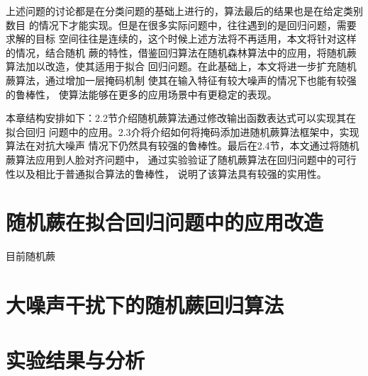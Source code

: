 上述问题的讨论都是在分类问题的基础上进行的，算法最后的结果也是在给定类别数目
的情况下才能实现。但是在很多实际问题中，往往遇到的是回归问题，需要求解的目标
空间往往是连续的，这个时候上述方法将不再适用，本文将针对这样的情况，结合随机
蕨的特性，借鉴回归算法在随机森林算法中的应用，将随机蕨算法加以改造，使其适用于拟合
回归问题。在此基础上，本文将进一步扩充随机蕨算法，通过增加一层掩码机制
使其在输入特征有较大噪声的情况下也能有较强的鲁棒性，
使算法能够在更多的应用场景中有更稳定的表现。

本章结构安排如下：2.2节介绍随机蕨算法通过修改输出函数表达式可以实现其在拟合回归
问题中的应用。2.3介将介绍如何将掩码添加进随机蕨算法框架中，实现算法在对抗大噪声
情况下仍然具有较强的鲁棒性。最后在2.4节，本文通过将随机蕨算法应用到人脸对齐问题中，
通过实验验证了随机蕨算法在回归问题中的可行性以及相比于普通拟合算法的鲁棒性，
说明了该算法具有较强的实用性。


\section{随机蕨在拟合回归问题中的应用改造}
目前随机蕨

\section{大噪声干扰下的随机蕨回归算法}

\section{实验结果与分析} %




























